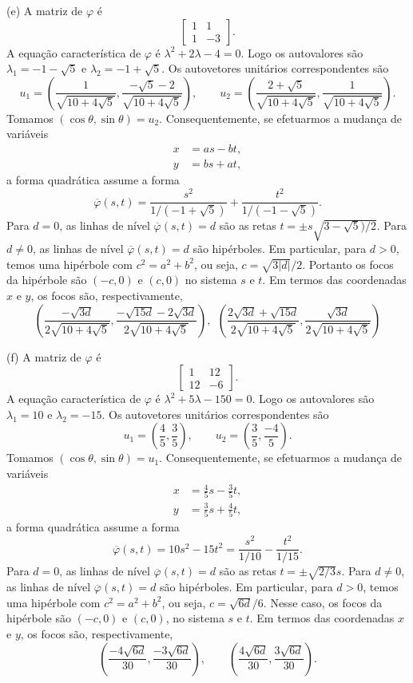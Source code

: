 \documentclass[a4paper,11pt]{article}
\begin{document}
(e)
A matriz de $\varphi$ é
\[
  \begin{bmatrix}
    1 & 1 \\
    1 & -3
  \end{bmatrix}.
\]
A equação característica de $\varphi$ é $\lambda^2 + 2 \lambda - 4 = 0$.
Logo os autovalores são $\lambda_1 = -1-\sqrt{5}$ e $\lambda_2 = -1+\sqrt{5}$.
Os autovetores unitários correspondentes são
\[
  u_1 = \left( \frac{1}{\sqrt{10 + 4\sqrt{5}}}, \frac{-\sqrt{5}-2}{\sqrt{10 + 4\sqrt{5}}} \right), \qquad u_2 = \left( \frac{2+\sqrt{5}}{\sqrt{10 + 4\sqrt{5}}}, \frac{1}{\sqrt{10 + 4\sqrt{5}}} \right).
\]
Tomamos $(\cos \theta, \sin \theta) = u_2$.
Consequentemente, se efetuarmos a mudança de variáveis
\begin{align*}
  x & = a s - b t, \\
  y & = b s + a t,
\end{align*}
a forma quadrática assume a forma
\[
  \overline{\varphi}(s,t) = \frac{s^2}{1/(-1+\sqrt{5})} + \frac{t^2}{1/(-1-\sqrt{5})}.
\]
Para $d = 0$, as linhas de nível $\overline{\varphi}(s,t) = d$ são as retas $t = \pm s \sqrt{3-\sqrt{5})/2}$.
Para $d \neq 0$, as linhas de nível $\overline{\varphi}(s,t) = d$ são hipérboles.
Em particular, para $d > 0$, temos uma hipérbole com $c^2 = a^2 + b^2$, ou seja, $c = \sqrt{3|d|}/2$.
Portanto os focos da hipérbole são $(-c,0)$ e $(c,0)$ no sistema $s$ e $t$.
Em termos das coordenadas $x$ e $y$, os focos são, respectivamente,
\[
  \left( \frac{-\sqrt{3d}}{2\sqrt{10 + 4\sqrt{5}}}, \frac{-\sqrt{15d}-2\sqrt{3d}}{2\sqrt{10 + 4\sqrt{5}}} \right), \ \ \left( \frac{2\sqrt{3d}+\sqrt{15d}}{2\sqrt{10 + 4\sqrt{5}}}, \frac{\sqrt{3d}}{2\sqrt{10 + 4\sqrt{5}}} \right)
\]

(f)
A matriz de $\varphi$ é
\[
  \begin{bmatrix}
    1 & 12 \\
    12 & -6
  \end{bmatrix}.
\]
A equação característica de $\varphi$ é $\lambda^2 + 5\lambda - 150 = 0$.
Logo os autovalores são $\lambda_1 = 10$ e $\lambda_2 = -15$.
Os autovetores unitários correspondentes são
\[
  u_1 = \left( \frac{4}{5}, \frac{3}{5} \right), \qquad u_2 = \left( \frac{3}{5}, \frac{-4}{5} \right).
\]
Tomamos $(\cos \theta, \sin \theta) = u_1$.
Consequentemente, se efetuarmos a mudança de variáveis
\begin{align*}
  x & = \frac{4}{5} s - \frac{3}{5} t, \\
  y & = \frac{3}{5} s + \frac{4}{5} t,
\end{align*}
a forma quadrática assume a forma
\[
  \overline{\varphi}(s,t) = 10 s^2 - 15 t^2 = \frac{s^2}{1/10} - \frac{t^2}{1/15}.
\]
Para $d = 0$, as linhas de nível $\overline{\varphi}(s,t) = d$ são as retas $t = \pm \sqrt{2/3} s$.
Para $d \neq 0$, as linhas de nível $\overline{\varphi}(s,t) = d$ são hipérboles.
Em particular, para $d > 0$, temos uma hipérbole com $c^2 = a^2 + b^2$, ou seja, $c = \sqrt{6d}/6$.
Nesse caso, os focos da hipérbole são $(-c,0)$ e $(c,0)$, no sistema $s$ e $t$.
Em termos das coordenadas $x$ e $y$, os focos são, respectivamente,
\[
  \left( \frac{-4\sqrt{6d}}{30}, \frac{-3\sqrt{6d}}{30} \right), \qquad \left( \frac{4\sqrt{6d}}{30}, \frac{3\sqrt{6d}}{30} \right).
\]
\end{document}
